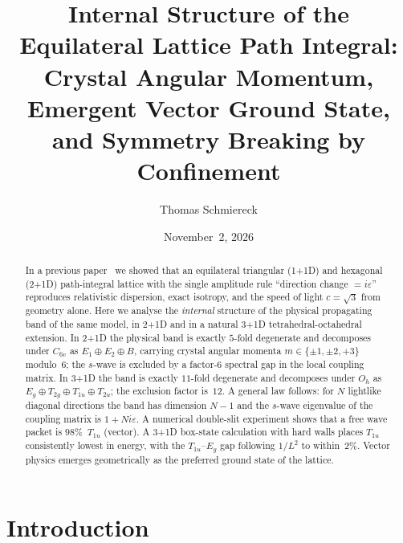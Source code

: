 \documentclass[twocolumn,showpacs,preprintnumbers,amsmath,amssymb]{revtex4-2}
\newcommand{\eps}{\varepsilon}
\newcommand{\Oh}{O_{h}}
\newcommand{\Csix}{C_{6v}}
\begin{document}

\title{Internal Structure of the Equilateral Lattice Path Integral:\\
Crystal Angular Momentum, Emergent Vector Ground State,\\
and Symmetry Breaking by Confinement}

\author{Thomas Schmiereck}

\date{November~2, 2026}

\begin{abstract}
In a previous paper~\cite{schmiereck2026} we showed that an equilateral
triangular (\mbox{1\!+\!1D}) and hexagonal (\mbox{2\!+\!1D}) path-integral
lattice with the single amplitude rule ``direction change $=i\eps$'' reproduces
relativistic dispersion, exact isotropy, and the speed of light $c=\sqrt{3}$
from geometry alone.
Here we analyse the \emph{internal} structure of the physical propagating
band of the same model, in \mbox{2\!+\!1D} and in a natural
\mbox{3\!+\!1D} tetrahedral-octahedral extension.
In \mbox{2\!+\!1D} the physical band is exactly $5$-fold degenerate and
decomposes under $\Csix$ as $E_{1}\oplus E_{2}\oplus B$, carrying crystal
angular momenta $m\in\{\pm1,\pm2,+3\}$ modulo~$6$; the $s$-wave is excluded by
a factor-$6$ spectral gap in the local coupling matrix.
In \mbox{3\!+\!1D} the band is exactly $11$-fold degenerate and decomposes
under $\Oh$ as $E_{g}\oplus T_{2g}\oplus T_{1u}\oplus T_{2u}$; the exclusion
factor is~$12$.
A general law follows: for $N$ lightlike diagonal directions the band has
dimension $N-1$ and the $s$-wave eigenvalue of the coupling matrix is
$1+Ni\eps$.
A numerical double-slit experiment shows that a free wave packet is
$98\%$~$T_{1u}$ (vector).
A \mbox{3\!+\!1D} box-state calculation with hard walls places $T_{1u}$
consistently lowest in energy, with the $T_{1u}$--$E_{g}$ gap following
$1/L^{2}$ to within~$2\%$.
Vector physics emerges geometrically as the preferred ground state of the
lattice.
\end{abstract}

\maketitle

\section{Introduction}
\label{sec:intro}
\end{document}
